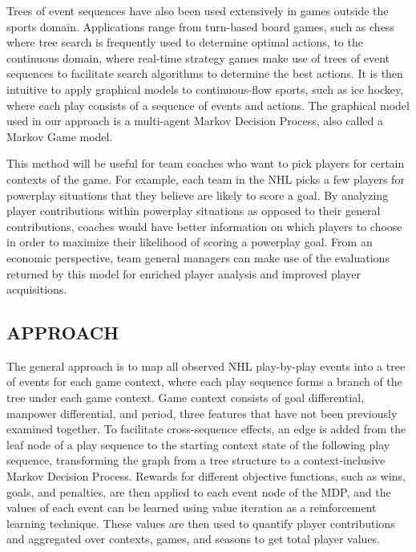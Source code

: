 \documentclass[]{article}
\begin{document}
Trees of event sequences have also been used extensively in games outside the sports domain. Applications range from turn-based board games, such as chess \citep{Berliner1979} where tree search is frequently used to determine optimal actions, to the continuous domain, where real-time strategy games \citep{Churchill2013} make use of trees of event sequences to facilitate search algorithms to determine the best actions. It is then intuitive to apply graphical models to continuous-flow sports, such as ice hockey, where each play consists of a sequence of events and actions. The graphical model used in our approach is a multi-agent Markov Decision Process, also called a Markov Game model.

This method will be useful for team coaches who want to pick players for certain contexts of the game. For example, each team in the NHL picks a few players for powerplay situations that they believe are likely to score a goal. By analyzing player contributions within powerplay situations as opposed to their general contributions, coaches would have better information on which players to choose in order to maximize their likelihood of scoring a powerplay goal. From an economic perspective, team general managers can make use of the evaluations returned by this model for enriched player analysis and improved player acquisitions.


\subsection{APPROACH}

The general approach is to map all observed NHL play-by-play events into a tree of events for each game context, where each play sequence forms a branch of the tree under each game context. Game context consists of goal differential, manpower differential, and period, three features that have not been previously examined together. To facilitate cross-sequence effects, an edge is added from the leaf node of a play sequence to the starting context state of the following play sequence, transforming the graph from a tree structure to a context-inclusive Markov Decision Process. Rewards for different objective functions, such as wins, goals, and penalties, are then applied to each event node of the MDP, and the values of each event can be learned using value iteration as a reinforcement learning technique. These values are then used to quantify player contributions and aggregated over contexts, games, and seasons to get total player values.
\end{document}
